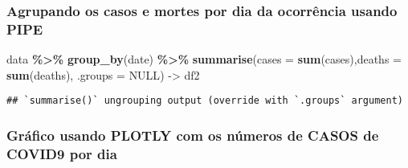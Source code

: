\documentclass[
]{article}
\newenvironment{Shaded}{\begin{snugshade}}{\end{snugshade}}
\newcommand{\DataTypeTok}[1]{\textcolor[rgb]{0.13,0.29,0.53}{#1}}
\newcommand{\KeywordTok}[1]{\textcolor[rgb]{0.13,0.29,0.53}{\textbf{#1}}}
\newcommand{\NormalTok}[1]{#1}
\newcommand{\OperatorTok}[1]{\textcolor[rgb]{0.81,0.36,0.00}{\textbf{#1}}}
\newcommand{\OtherTok}[1]{\textcolor[rgb]{0.56,0.35,0.01}{#1}}
\newcommand{\StringTok}[1]{\textcolor[rgb]{0.31,0.60,0.02}{#1}}
\begin{document}
\hypertarget{agrupando-os-casos-e-mortes-por-dia-da-ocorruxeancia-usando-pipe}{%
\subsubsection{Agrupando os casos e mortes por dia da ocorrência usando
PIPE}\label{agrupando-os-casos-e-mortes-por-dia-da-ocorruxeancia-usando-pipe}}

\begin{Shaded}
\begin{Highlighting}[]
\NormalTok{data }\OperatorTok{\%\textgreater{}\%}
\StringTok{  }\KeywordTok{group\_by}\NormalTok{(date) }\OperatorTok{\%\textgreater{}\%}
\StringTok{  }\KeywordTok{summarise}\NormalTok{(}\DataTypeTok{cases =} \KeywordTok{sum}\NormalTok{(cases),}\DataTypeTok{deaths =} \KeywordTok{sum}\NormalTok{(deaths), }\DataTypeTok{.groups =} \OtherTok{NULL}\NormalTok{) {-}\textgreater{}}\StringTok{ }\NormalTok{df2}
\end{Highlighting}
\end{Shaded}

\begin{verbatim}
## `summarise()` ungrouping output (override with `.groups` argument)
\end{verbatim}

\hypertarget{gruxe1fico-usando-plotly-com-os-nuxfameros-de-casos-de-covid9-por-dia}{%
\subsubsection{Gráfico usando PLOTLY com os números de CASOS de COVID9
por
dia}\label{gruxe1fico-usando-plotly-com-os-nuxfameros-de-casos-de-covid9-por-dia}}

\begin{Shaded}
\end{Shaded}

\hypertarget{htmlwidget-042e42af2a7cfc109ea2}{}
\begin{plotly}

\end{plotly}
\end{document}
